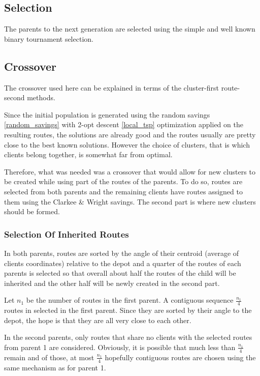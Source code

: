 \documentclass{article} %
\begin{document}
\subsection{Selection}

The parents to the next generation are selected using the simple and well known binary tournament selection.


\subsection{Crossover}

The crossover used here can be explained in terms of the cluster-first route-second methods.\newline

Since the initial population is generated using the random savings \ref{random_savings} with 2-opt descent \ref{local_tsp} optimization applied on the resulting routes, the solutions are already good and the routes usually are pretty close to the best known solutions. However the choice of clusters, that is which clients belong together, is somewhat far from optimal.\newline

Therefore, what was needed was a crossover that would allow for new clusters to be created while using part of the routes of the parents. To do so, routes are selected from both parents and the remaining clients have routes assigned to them using the Clarkee \& Wright savings. The second part is where new clusters should be formed.


\subsubsection{Selection Of Inherited Routes}

In both parents, routes are sorted by the angle of their centroid (average of clients coordinates) relative to the depot and a quarter of the routes of each parents is selected so that overall about half the routes of the child will be inherited and the other half will be newly created in the second part.\newline

Let $n_1$ be the number of routes in the first parent. A contiguous sequence $\frac{n_1}{4}$ routes in selected in the first parent. Since they are sorted by their angle to the depot, the hope is that they are all very close to each other.\newline

In the second parents, only routes that share no clients with the selected routes from parent 1 are considered.  Obviously, it is possible that much less than $\frac{n_1}{4}$ remain and of those, at most $\frac{n_1}{4}$ hopefully contiguous routes are chosen using the same mechanism as for parent 1.\newline
\end{document}
